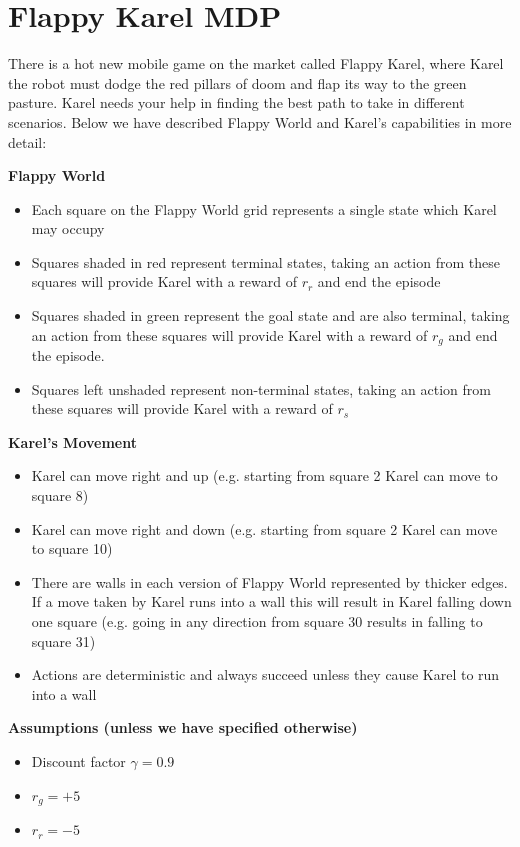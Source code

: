 \section{Flappy Karel MDP}

There is a hot new mobile game on the market called Flappy Karel, where Karel the robot must dodge the red pillars of doom and flap its way to the green pasture. Karel needs your help in finding the best path to take in different scenarios. Below we have described Flappy World and Karel's capabilities in more detail:

\textbf{Flappy World}

\begin{itemize}
  \item Each square on the Flappy World grid represents a single state which Karel may occupy
  \item Squares shaded in red represent terminal states, taking an action from these squares will provide Karel with a reward of $r_{r}$ and end the episode
  \item Squares shaded in green represent the goal state and are also terminal, taking an action from these squares will provide Karel with a reward of $r_{g}$ and end the episode.
  \item Squares left unshaded represent non-terminal states, taking an action from these squares will provide Karel with a reward of $r_{s}$
\end{itemize}

\textbf{Karel's Movement} 

\begin{itemize}
  \item Karel can move right and up (e.g. starting from square 2 Karel can move to square 8)
  \item Karel can move right and down (e.g. starting from square 2 Karel can move to square 10)
  \item There are walls in each version of Flappy World represented by thicker edges. If a move taken by Karel runs into a wall this will result in Karel falling down one square (e.g. going in any direction from square 30 results in falling to square 31)
  \item Actions are deterministic and always succeed unless they cause Karel to run into a wall
\end{itemize}

\textbf{Assumptions (unless we have specified otherwise)}
\begin{itemize}
  \item Discount factor $\gamma = 0.9$
  \item $r_{g} = +5$
  \item $r_{r} = -5$
\end{itemize}


